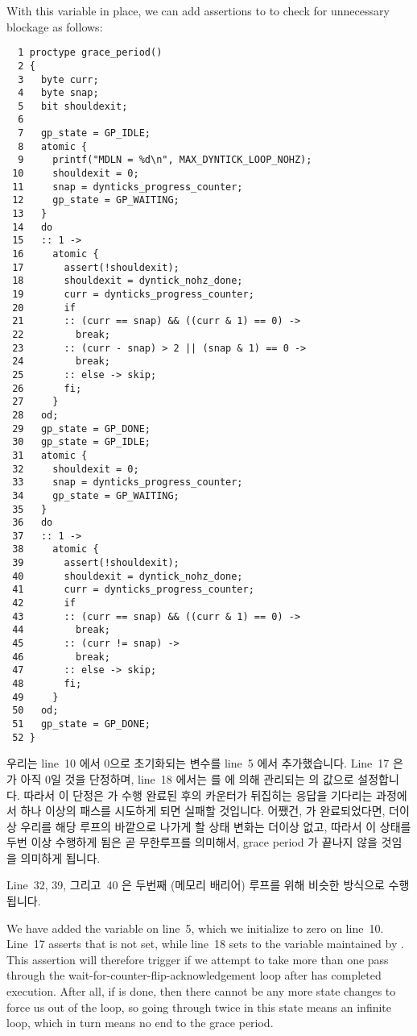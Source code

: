 With this variable in place, we can add assertions to
 to check for unnecessary blockage
as follows:
\fi

{ \scriptsize
\begin{verbatim}
  1 proctype grace_period()
  2 {
  3   byte curr;
  4   byte snap;
  5   bit shouldexit;
  6
  7   gp_state = GP_IDLE;
  8   atomic {
  9     printf("MDLN = %d\n", MAX_DYNTICK_LOOP_NOHZ);
 10     shouldexit = 0;
 11     snap = dynticks_progress_counter;
 12     gp_state = GP_WAITING;
 13   }
 14   do
 15   :: 1 ->
 16     atomic {
 17       assert(!shouldexit);
 18       shouldexit = dyntick_nohz_done;
 19       curr = dynticks_progress_counter;
 20       if
 21       :: (curr == snap) && ((curr & 1) == 0) ->
 22         break;
 23       :: (curr - snap) > 2 || (snap & 1) == 0 ->
 24         break;
 25       :: else -> skip;
 26       fi;
 27     }
 28   od;
 29   gp_state = GP_DONE;
 30   gp_state = GP_IDLE;
 31   atomic {
 32     shouldexit = 0;
 33     snap = dynticks_progress_counter;
 34     gp_state = GP_WAITING;
 35   }
 36   do
 37   :: 1 ->
 38     atomic {
 39       assert(!shouldexit);
 40       shouldexit = dyntick_nohz_done;
 41       curr = dynticks_progress_counter;
 42       if
 43       :: (curr == snap) && ((curr & 1) == 0) ->
 44         break;
 45       :: (curr != snap) ->
 46         break;
 47       :: else -> skip;
 48       fi;
 49     }
 50   od;
 51   gp_state = GP_DONE;
 52 }
\end{verbatim}
}

우리는 line~10 에서 0으로 초기화되는  변수를 line~5 에서
추가했습니다.
Line~17 은  가 아직 0일 것을 단정하며, line~18 에서는
 를  에 의해 관리되는 
의 값으로 설정합니다.
따라서 이 단정은  가 수행 완료된 후의 카운터가 뒤집히는
응답을 기다리는 과정에서 하나 이상의 패스를 시도하게 되면 실패할 것입니다.
어쨌건,  가 완료되었다면, 더이상 우리를 해당 루프의 바깥으로
나가게 할 상태 변화는 더이상 없고, 따라서 이 상태를 두번 이상 수행하게 됨은 곧
무한루프를 의미해서, grace period 가 끝나지 않을 것임을 의미하게 됩니다.

Line~32, 39, 그리고~40 은 두번째 (메모리 배리어) 루프를 위해 비슷한 방식으로
수행됩니다.
\iffalse

We have added the  variable on line~5,
which we initialize to zero on line~10.
Line~17 asserts that  is not set, while
line~18 sets  to the 
variable maintained by .
This assertion will therefore trigger if we attempt to take more than
one pass through the wait-for-counter-flip-acknowledgement
loop after  has completed
execution.
After all, if  is done, then there cannot be
any more state changes to force us out of the loop, so going through twice
in this state means an infinite loop, which in turn means no end to the
grace period.

